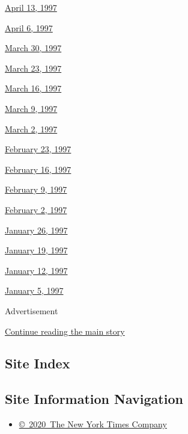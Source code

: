 \href{http://www.nytimes.com/books/97/04/13/home/contents.html}{April
13, 1997}

\href{http://www.nytimes.com/books/97/04/06/home/contents.html}{April 6,
1997}

\href{http://www.nytimes.com/books/97/03/30/home/contents.html}{March
30, 1997}

\href{http://www.nytimes.com/books/97/03/23/home/contents.html}{March
23, 1997}

\href{http://www.nytimes.com/books/97/03/16/home/contents.html}{March
16, 1997}

\href{http://www.nytimes.com/books/97/03/09/home/contents.html}{March 9,
1997}

\href{http://www.nytimes.com/books/97/03/02/home/contents.html}{March 2,
1997}

\href{http://www.nytimes.com/books/97/02/23/home/contents.html}{February
23, 1997}

\href{http://www.nytimes.com/books/97/02/16/home/contents.html}{February
16, 1997}

\href{http://www.nytimes.com/books/97/02/09/home/contents.html}{February
9, 1997}

\href{http://www.nytimes.com/books/97/02/02/home/contents.html}{February
2, 1997}

\href{http://www.nytimes.com/books/97/01/26/home/contents.html}{January
26, 1997}

\href{http://www.nytimes.com/books/97/01/19/home/contents.html}{January
19, 1997}

\href{http://www.nytimes.com/books/97/01/12/home/contents.html}{January
12, 1997}

\href{http://www.nytimes.com/books/97/01/05/home/contents.html}{January
5, 1997}

Advertisement

\protect\hyperlink{after-bottom}{Continue reading the main story}

\hypertarget{site-index}{%
\subsection{Site Index}\label{site-index}}

\hypertarget{site-information-navigation}{%
\subsection{Site Information
Navigation}\label{site-information-navigation}}

\begin{itemize}
\tightlist
\item
  \href{https://help.nytimes.com/hc/en-us/articles/115014792127-Copyright-notice}{©~2020~The
  New York Times Company}
\end{itemize}

